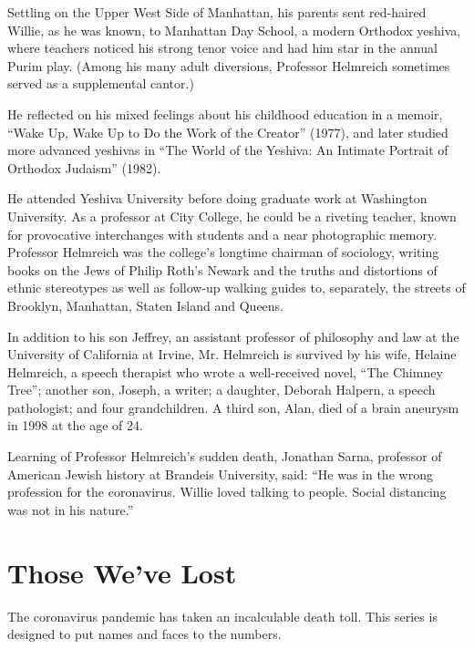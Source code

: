 Settling on the Upper West Side of Manhattan, his parents sent
red-haired Willie, as he was known, to Manhattan Day School, a modern
Orthodox yeshiva, where teachers noticed his strong tenor voice and had
him star in the annual Purim play. (Among his many adult diversions,
Professor Helmreich sometimes served as a supplemental cantor.)

He reflected on his mixed feelings about his childhood education in a
memoir, ``Wake Up, Wake Up to Do the Work of the Creator'' (1977), and
later studied more advanced yeshivas in ``The World of the Yeshiva: An
Intimate Portrait of Orthodox Judaism'' (1982).

He attended Yeshiva University before doing graduate work at Washington
University. As a professor at City College, he could be a riveting
teacher, known for provocative interchanges with students and a near
photographic memory. Professor Helmreich was the college's longtime
chairman of sociology, writing books on the Jews of Philip Roth's Newark
and the truths and distortions of ethnic stereotypes as well as
follow-up walking guides to, separately, the streets of Brooklyn,
Manhattan, Staten Island and Queens.

In addition to his son Jeffrey, an assistant professor of philosophy and
law at the University of California at Irvine, Mr. Helmreich is survived
by his wife, Helaine Helmreich, a speech therapist who wrote a
well-received novel, ``The Chimney Tree''; another son, Joseph, a
writer; a daughter, Deborah Halpern, a speech pathologist; and four
grandchildren. A third son, Alan, died of a brain aneurysm in 1998 at
the age of 24.

Learning of Professor Helmreich's sudden death, Jonathan Sarna,
professor of American Jewish history at Brandeis University, said: ``He
was in the wrong profession for the coronavirus. Willie loved talking to
people. Social distancing was not in his nature.''

\href{https://www.nytimes.com/interactive/2020/obituaries/people-died-coronavirus-obituaries.html?action=click\&pgtype=Article\&state=default\&region=BELOW_MAIN_CONTENT\&context=covid_obits_promo}{}

\hypertarget{those-weve-lost}{%
\section{Those We've Lost}\label{those-weve-lost}}

The coronavirus pandemic has taken an incalculable death toll. This
series is designed to put names and faces to the numbers.

